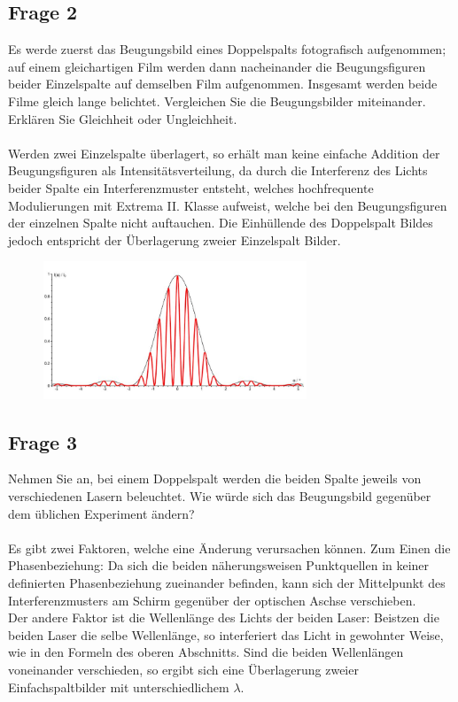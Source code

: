 \documentclass[a4paper,10pt]{scrartcl}
\begin{document}
		\subsection{Frage 2}
		Es werde zuerst das Beugungsbild eines Doppelspalts fotografisch aufgenommen; auf einem
		gleichartigen Film werden dann nacheinander die Beugungsfiguren beider Einzelspalte auf
		demselben Film aufgenommen. Insgesamt werden beide Filme gleich lange belichtet. Vergleichen
		Sie die Beugungsbilder miteinander. Erklären Sie Gleichheit oder Ungleichheit.\\
		\\
		Werden zwei Einzelspalte überlagert, so erhält man keine einfache Addition der Beugungsfiguren als Intensitätsverteilung, da durch die Interferenz des Lichts beider Spalte ein Interferenzmuster entsteht, welches hochfrequente Modulierungen mit Extrema II. Klasse aufweist, welche bei den Beugungsfiguren der einzelnen Spalte nicht auftauchen. Die Einhüllende des Doppelspalt Bildes jedoch entspricht der Überlagerung zweier Einzelspalt Bilder.

\FloatBarrier
			\begin{figure}[h]
\centering
\includegraphics[width=0.7\textwidth]{./Bilder/lb1}

\end{figure}
\FloatBarrier
		\subsection{Frage 3}
		Nehmen Sie an, bei einem Doppelspalt werden die beiden Spalte jeweils von verschiedenen
		Lasern beleuchtet. Wie würde sich das Beugungsbild gegenüber dem üblichen Experiment ändern?\\
		\\
		Es gibt zwei Faktoren, welche eine Änderung verursachen können. Zum Einen die Phasenbeziehung: Da sich die beiden näherungsweisen Punktquellen in keiner definierten Phasenbeziehung zueinander befinden, kann sich der Mittelpunkt des Interferenzmusters am Schirm gegenüber der optischen Aschse verschieben.\\
		Der andere Faktor ist die Wellenlänge des Lichts der beiden Laser: Beistzen die beiden Laser die selbe Wellenlänge, so interferiert das Licht in gewohnter Weise, wie in den Formeln des oberen Abschnitts. Sind die beiden Wellenlängen voneinander verschieden, so ergibt sich eine Überlagerung zweier Einfachspaltbilder mit unterschiedlichem \(\lambda\).
		
\end{document}
